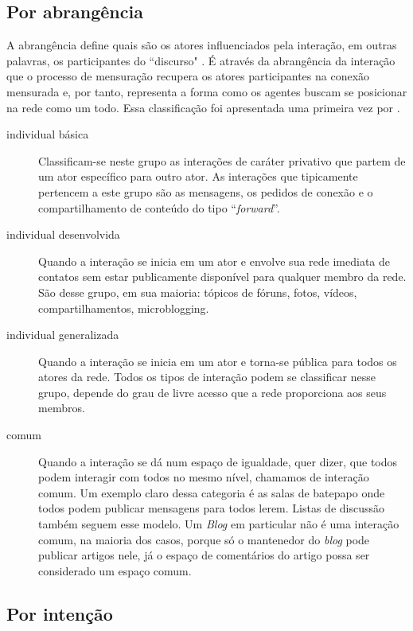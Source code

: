 \subsection{Por abrangência}

A abrangência define quais são os atores influenciados pela interação, em
outras palavras, os participantes do ``discurso" \citep{Dooley2001}. É através da
abrangência da interação que o processo de mensuração recupera os atores
participantes na conexão mensurada e, por tanto, representa a forma como os
agentes buscam se posicionar na rede como um todo. Essa classificação foi
apresentada uma primeira vez por \citet{MARTINEZ2000}.
\begin{description}
\item[individual básica] Classificam-se neste grupo as interações de caráter
privativo que partem de um ator específico para outro ator. As interações que
tipicamente pertencem a este grupo são as mensagens, os pedidos de conexão e o
compartilhamento de conteúdo do tipo ``\textit{forward}''.
\item[individual desenvolvida] Quando a interação se inicia em um ator e envolve
sua rede imediata de contatos sem estar publicamente disponível para qualquer
membro da rede. São desse grupo, em sua maioria: tópicos de fóruns, fotos,
vídeos, compartilhamentos, microblogging.
\item[individual generalizada] Quando a interação se inicia em um ator e
torna-se pública para todos os atores da rede. Todos os tipos de interação podem
se classificar nesse grupo, depende do grau de livre acesso que a rede
proporciona aos seus membros.
\item[comum] Quando a interação se dá num espaço de igualdade, quer dizer, que
todos podem interagir com todos no mesmo nível, chamamos de interação comum. Um
exemplo claro dessa categoria é as salas de batepapo onde todos podem publicar
mensagens para todos lerem. Listas de discussão também seguem esse modelo.
Um \textit{Blog} em particular não é uma interação comum, na maioria dos casos,
porque só o mantenedor do \textit{blog} pode publicar artigos nele, já o
espaço de comentários do artigo possa ser considerado um espaço comum.
\end{description}

\subsection{Por intenção}

